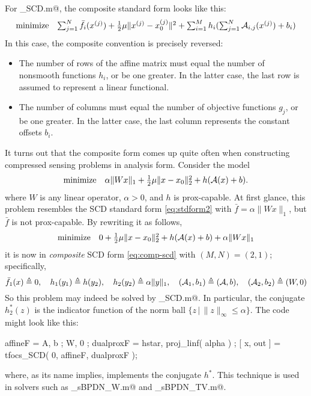 \documentclass{article}
\begin{document}
For \verb@tfocs_SCD.m@, the composite standard form looks like this:
\begin{equation}
	\label{eq:comp-scd}
	\begin{array}{ll}
		\text{minimize} &  \sum_{j=1}^N \bar{f}_i(x^{(j)}) + {\textstyle\frac{1}{2}} \mu \| x^{(j)} - x_0^{(j)} \|^2 + \sum_{i=1}^M h_i(\sum_{j=1}^N \mathcal{A}_{i,j}(x^{(j)})+b_i)
	\end{array}		
\end{equation}
In this case, the composite convention is precisely reversed:
\begin{itemize}
\item The number of rows of the affine matrix must equal the number of
nonsmooth functions $h_i$, or be one greater. In the latter case, the
last row is assumed to represent a linear functional.
\item The number of columns must equal the number of objective
functions $g_j$, or be one greater. In the latter case, the last
column represents the constant offsets $b_i$.
\end{itemize}

It turns out that the composite form comes up quite often when 
constructing compressed sensing problems in analysis form. Consider the model
\begin{equation}
	\label{eq:stdform4a} %
	\begin{array}{ll}
	\text{minimize} & \alpha\|Wx\|_1 + \thalf\mu\|x-x_0\|_2^2 + h(\cA(x)+b).
	\end{array}
\end{equation}
where $W$ is any linear operator, $\alpha > 0$, and $h$ is prox-capable.
At first glance, this problem
resembles the SCD standard form \eqref{eq:stdform2} with
$\bar{f} = \alpha\|Wx\|_1$, but $\bar{f}$ is not prox-capable. 
By rewriting it as follows,
\begin{equation}
	\label{eq:stdform4}
	\begin{array}{ll}
	\text{minimize} & 0 + {\textstyle\frac{1}{2}}\mu\|x-x_0\|_2^2 + h(\mathcal{A}(x)+b) + \alpha\|Wx\|_1 
	\end{array}
\end{equation}
it is now in \emph{composite} SCD form \eqref{eq:comp-scd} with $(M,N)=(2,1)$; specifically,
\begin{equation}
	\bar{f}_1(x) \triangleq 0, \quad h_1(y_1)\triangleq h(y_2), \quad h_2(y_2) \triangleq \alpha\|y\|_1, \quad
	(\mathcal{A}_1,b_1)\triangleq (\mathcal{A},b), \quad (\mathcal{A}_2,b_2) \triangleq (W,0)
\end{equation}
So this problem may indeed be solved by \verb@tfocs_SCD.m@. In particular,
the conjugate $h^*_2(z)$ is the indicator function of the norm ball $\{z\,|\,\|z\|_\infty\leq\alpha\}$.
The code might look like this:
\begin{code}
	affineF = { A, b ; W, 0 };
	dualproxF = { hstar, proj_linf( alpha ) };
	[ x, out ] = tfocs_SCD( 0, affineF, dualproxF );
\end{code}
where, as its name implies, \verb@hstar@ implements the conjugate $h^*$.
This technique is used in solvers such as \verb@solver_sBPDN_W.m@
and \verb@solver_sBPDN_TV.m@.
\end{document}
